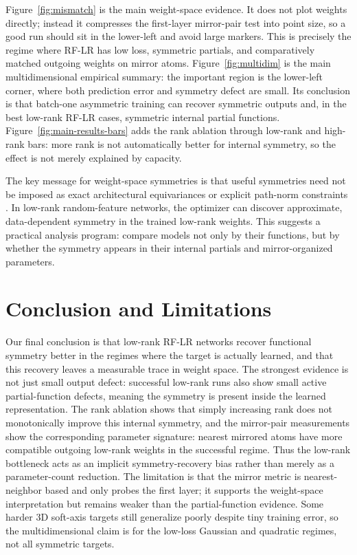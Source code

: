 \documentclass[nohyperref]{article}
\begin{document}
Figure~\ref{fig:mismatch} is the main weight-space evidence.
It does not plot weights directly; instead it compresses the first-layer mirror-pair test into point size, so a good run should sit in the lower-left and avoid large markers.
This is precisely the regime where RF-LR has low loss, symmetric partials, and comparatively matched outgoing weights on mirror atoms.
Figure~\ref{fig:multidim} is the main multidimensional empirical summary: the important region is the lower-left corner, where both prediction error and symmetry defect are small.
Its conclusion is that batch-one asymmetric training can recover symmetric outputs and, in the best low-rank RF-LR cases, symmetric internal partial functions.
Figure~\ref{fig:main-results-bars} adds the rank ablation through low-rank and high-rank bars: more rank is not automatically better for internal symmetry, so the effect is not merely explained by capacity.

The key message for weight-space symmetries is that useful symmetries need not be imposed as exact architectural equivariances or explicit path-norm constraints \citep{neyshabur2015path}.
In low-rank random-feature networks, the optimizer can discover approximate, data-dependent symmetry in the trained low-rank weights.
This suggests a practical analysis program: compare models not only by their functions, but by whether the symmetry appears in their internal partials and mirror-organized parameters.

\section{Conclusion and Limitations}

Our final conclusion is that low-rank RF-LR networks recover functional symmetry better in the regimes where the target is actually learned, and that this recovery leaves a measurable trace in weight space.
The strongest evidence is not just small output defect: successful low-rank runs also show small active partial-function defects, meaning the symmetry is present inside the learned representation.
The rank ablation shows that simply increasing rank does not monotonically improve this internal symmetry, and the mirror-pair measurements show the corresponding parameter signature: nearest mirrored atoms have more compatible outgoing low-rank weights in the successful regime.
Thus the low-rank bottleneck acts as an implicit symmetry-recovery bias rather than merely as a parameter-count reduction.
The limitation is that the mirror metric is nearest-neighbor based and only probes the first layer; it supports the weight-space interpretation but remains weaker than the partial-function evidence.
Some harder 3D soft-axis targets still generalize poorly despite tiny training error, so the multidimensional claim is for the low-loss Gaussian and quadratic regimes, not all symmetric targets.



\end{document}

